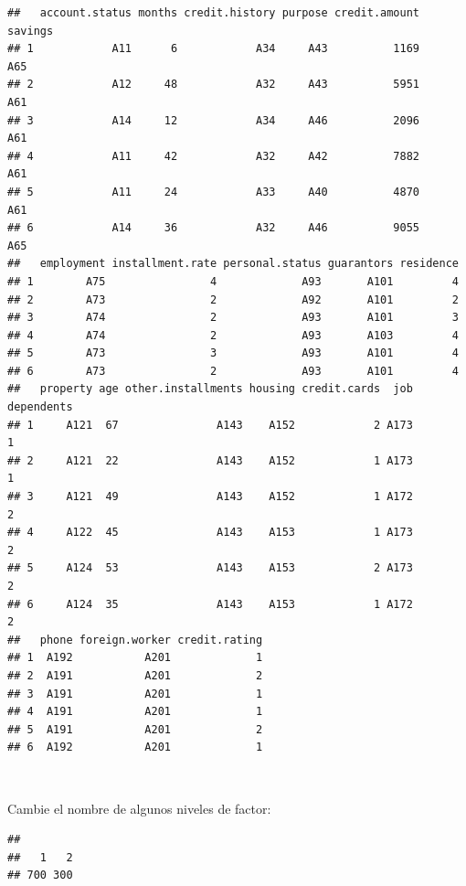 \documentclass[]{book}
\newenvironment{Shaded}{\begin{snugshade}}{\end{snugshade}}
\newcommand{\KeywordTok}[1]{\textcolor[rgb]{0.13,0.29,0.53}{\textbf{#1}}}
\newcommand{\CommentTok}[1]{\textcolor[rgb]{0.56,0.35,0.01}{\textit{#1}}}
\newcommand{\OperatorTok}[1]{\textcolor[rgb]{0.81,0.36,0.00}{\textbf{#1}}}
\newcommand{\NormalTok}[1]{#1}
\begin{document}
\begin{verbatim}
##   account.status months credit.history purpose credit.amount savings
## 1            A11      6            A34     A43          1169     A65
## 2            A12     48            A32     A43          5951     A61
## 3            A14     12            A34     A46          2096     A61
## 4            A11     42            A32     A42          7882     A61
## 5            A11     24            A33     A40          4870     A61
## 6            A14     36            A32     A46          9055     A65
##   employment installment.rate personal.status guarantors residence
## 1        A75                4             A93       A101         4
## 2        A73                2             A92       A101         2
## 3        A74                2             A93       A101         3
## 4        A74                2             A93       A103         4
## 5        A73                3             A93       A101         4
## 6        A73                2             A93       A101         4
##   property age other.installments housing credit.cards  job dependents
## 1     A121  67               A143    A152            2 A173          1
## 2     A121  22               A143    A152            1 A173          1
## 3     A121  49               A143    A152            1 A172          2
## 4     A122  45               A143    A153            1 A173          2
## 5     A124  53               A143    A153            2 A173          2
## 6     A124  35               A143    A153            1 A172          2
##   phone foreign.worker credit.rating
## 1  A192           A201             1
## 2  A191           A201             2
## 3  A191           A201             1
## 4  A191           A201             1
## 5  A191           A201             2
## 6  A192           A201             1
\end{verbatim}

~

Cambie el nombre de algunos niveles de factor:

\begin{Shaded}
\end{Shaded}

\begin{verbatim}
## 
##   1   2 
## 700 300
\end{verbatim}
\end{document}
